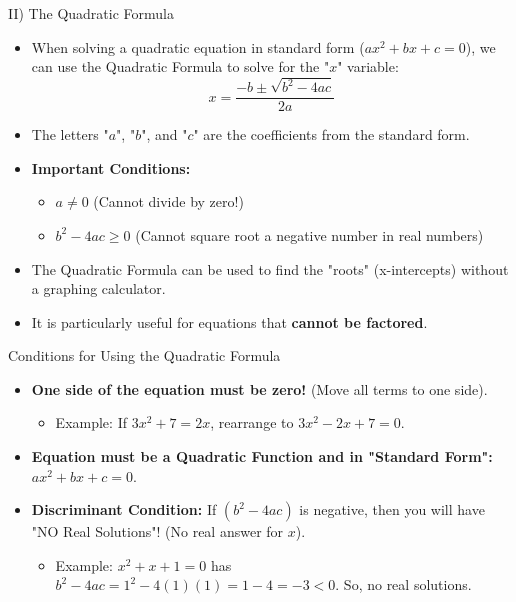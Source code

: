 \documentclass[aspectratio=169]{beamer}
\begin{document}
\begin{frame}{II) The Quadratic Formula}
    \begin{tcolorbox}[colback=lightgray,colframe=primary,title=Solving Quadratic Equations]
        \footnotesize
        \begin{itemize}
            \item When solving a quadratic equation in standard form ($ax^2 + bx + c = 0$), we can use the Quadratic Formula to solve for the "$x$" variable:
                \[ x = \frac{-b \pm \sqrt{b^2 - 4ac}}{2a} \]
            \item The letters "$a$", "$b$", and "$c$" are the coefficients from the standard form.
            \item \textbf{Important Conditions:}
                \begin{itemize}
                    \item $a \neq 0$ (Cannot divide by zero!)
                    \item $b^2 - 4ac \ge 0$ (Cannot square root a negative number in real numbers)
                \end{itemize}
            \item The Quadratic Formula can be used to find the "roots" (x-intercepts) without a graphing calculator.
            \item It is particularly useful for equations that \textbf{cannot be factored}.
        \end{itemize}
    \end{tcolorbox}
\end{frame}

\begin{frame}{Conditions for Using the Quadratic Formula}
    \begin{tcolorbox}[colback=lightgray,colframe=primary,title=Key Rules]
        \footnotesize
        \begin{itemize}
            \item \textbf{One side of the equation must be zero!} (Move all terms to one side).
                \begin{itemize}
                    \item Example: If $3x^2 + 7 = 2x$, rearrange to $3x^2 - 2x + 7 = 0$.
                \end{itemize}
            \item \textbf{Equation must be a Quadratic Function and in "Standard Form":} $ax^2 + bx + c = 0$.
            \item \textbf{Discriminant Condition:} If $(b^2 - 4ac)$ is negative, then you will have "NO Real Solutions"! (No real answer for $x$).
                \begin{itemize}
                    \item Example: $x^2 + x + 1 = 0$ has $b^2 - 4ac = 1^2 - 4(1)(1) = 1 - 4 = -3 < 0$. So, no real solutions.
                \end{itemize}
        \end{itemize}
    \end{tcolorbox}
\end{frame}
\end{document}
